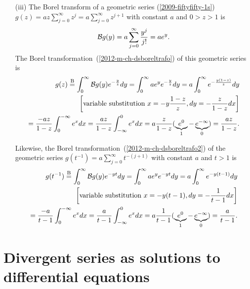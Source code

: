 {\begin{itemize}
\item[(iii)]
The Borel transform
of a geometric series (\ref{2009-fiftyfifty-1s})
$g(z)=a z \sum_{j=0}^\infty    z^{j}=a \sum_{j=0}^\infty    z^{j+1}$ with constant $a$ and $0> z > 1$
is
\begin{equation}
{\cal B}g (y)
=
a \sum_{j=0}^\infty   \frac{y^j}{j!} = a e^y.
\end{equation}
The Borel transformation~(\ref{2012-m-ch-dsboreltrafo}) of this geometric series  is
\begin{equation}
\begin{split}
g(z) \stackrel{{\rm B}}{=} \int_0^\infty {\cal B}g (y)   e^{-\frac{y}{z}}   dy
=
\int_0^\infty a e^y  e^{-\frac{y}{z}}   dy
=
a \int_0^\infty e^{-\frac{y(1-z)}{z}}   dy  \\
\left[\textrm{variable substitution } x =  -y\frac{1-z}{z}, dy = -\frac{z}{1-z} dx \right]\\
=
\frac{-a z}{1-z} \int_0^{-\infty} e^{x}   dx
=
\frac{a z}{1-z} \int_{-\infty}^0 e^{x}   dx
=
a \frac{z}{1-z} (\underbrace{e^0}_{1}-\underbrace{e^{-\infty}}_{0})    =  \frac{a z}{1-z}.
\end{split}
\end{equation}

Likewise, the Borel transformation~(\ref{2012-m-ch-dsboreltrafo2})
of the geometric series
$g(t^{-1})=a   \sum_{j=0}^\infty    t^{-(j+1)}$ with constant $a$ and $t > 1$
is
\begin{equation}
\begin{split}
g(t^{-1}) \stackrel{{\rm B}}{=} \int_0^\infty {\cal B}g (y)   e^{-yt}   dy
=
\int_0^\infty a e^y  e^{-yt}   dy
=
a \int_0^\infty e^{- y(t-1) }   dy  \\
\left[\textrm{variable substitution } x =  - y(t-1) , dy = -\frac{1}{t-1} dx \right]\\
=
\frac{-a}{t-1} \int_0^{-\infty} e^{x}   dx
=
\frac{a }{t-1} \int_{-\infty}^0 e^{x}   dx
=
a \frac{1}{t-1} (\underbrace{e^0}_{1}-\underbrace{e^{-\infty}}_{0})    =  \frac{a }{t-1}.
\end{split}
\end{equation}


\end{itemize}
\eexample
}


\section{Divergent series as solutions to differential equations}


